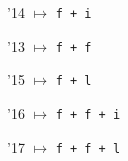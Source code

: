 \documentclass{article}
\begin{document}
\char'14 $\mapsto$ \texttt{f + i}\par
\char'13 $\mapsto$ \texttt{f + f}\par
\char'15 $\mapsto$ \texttt{f + l}\par
\char'16 $\mapsto$ \texttt{f + f + i}\par
\char'17 $\mapsto$ \texttt{f + f + l}\par
\end{document}
